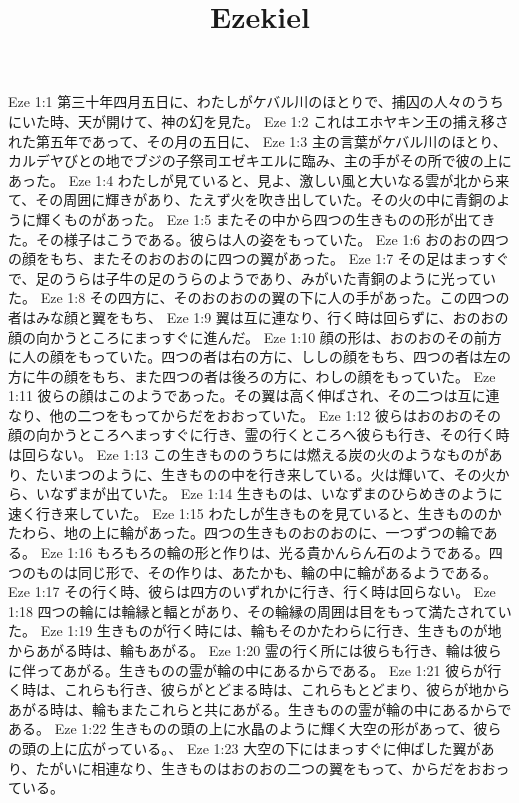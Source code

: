 

\title{Ezekiel}

Eze 1:1  第三十年四月五日に、わたしがケバル川のほとりで、捕囚の人々のうちにいた時、天が開けて、神の幻を見た。
Eze 1:2  これはエホヤキン王の捕え移された第五年であって、その月の五日に、
Eze 1:3  主の言葉がケバル川のほとり、カルデヤびとの地でブジの子祭司エゼキエルに臨み、主の手がその所で彼の上にあった。
Eze 1:4  わたしが見ていると、見よ、激しい風と大いなる雲が北から来て、その周囲に輝きがあり、たえず火を吹き出していた。その火の中に青銅のように輝くものがあった。
Eze 1:5  またその中から四つの生きものの形が出てきた。その様子はこうである。彼らは人の姿をもっていた。
Eze 1:6  おのおの四つの顔をもち、またそのおのおのに四つの翼があった。
Eze 1:7  その足はまっすぐで、足のうらは子牛の足のうらのようであり、みがいた青銅のように光っていた。
Eze 1:8  その四方に、そのおのおのの翼の下に人の手があった。この四つの者はみな顔と翼をもち、
Eze 1:9  翼は互に連なり、行く時は回らずに、おのおの顔の向かうところにまっすぐに進んだ。
Eze 1:10  顔の形は、おのおのその前方に人の顔をもっていた。四つの者は右の方に、ししの顔をもち、四つの者は左の方に牛の顔をもち、また四つの者は後ろの方に、わしの顔をもっていた。
Eze 1:11  彼らの顔はこのようであった。その翼は高く伸ばされ、その二つは互に連なり、他の二つをもってからだをおおっていた。
Eze 1:12  彼らはおのおのその顔の向かうところへまっすぐに行き、霊の行くところへ彼らも行き、その行く時は回らない。
Eze 1:13  この生きもののうちには燃える炭の火のようなものがあり、たいまつのように、生きものの中を行き来している。火は輝いて、その火から、いなずまが出ていた。
Eze 1:14  生きものは、いなずまのひらめきのように速く行き来していた。
Eze 1:15  わたしが生きものを見ていると、生きもののかたわら、地の上に輪があった。四つの生きものおのおのに、一つずつの輪である。
Eze 1:16  もろもろの輪の形と作りは、光る貴かんらん石のようである。四つのものは同じ形で、その作りは、あたかも、輪の中に輪があるようである。
Eze 1:17  その行く時、彼らは四方のいずれかに行き、行く時は回らない。
Eze 1:18  四つの輪には輪縁と輻とがあり、その輪縁の周囲は目をもって満たされていた。
Eze 1:19  生きものが行く時には、輪もそのかたわらに行き、生きものが地からあがる時は、輪もあがる。
Eze 1:20  霊の行く所には彼らも行き、輪は彼らに伴ってあがる。生きものの霊が輪の中にあるからである。
Eze 1:21  彼らが行く時は、これらも行き、彼らがとどまる時は、これらもとどまり、彼らが地からあがる時は、輪もまたこれらと共にあがる。生きものの霊が輪の中にあるからである。
Eze 1:22  生きものの頭の上に水晶のように輝く大空の形があって、彼らの頭の上に広がっている。、
Eze 1:23  大空の下にはまっすぐに伸ばした翼があり、たがいに相連なり、生きものはおのおの二つの翼をもって、からだをおおっている。
